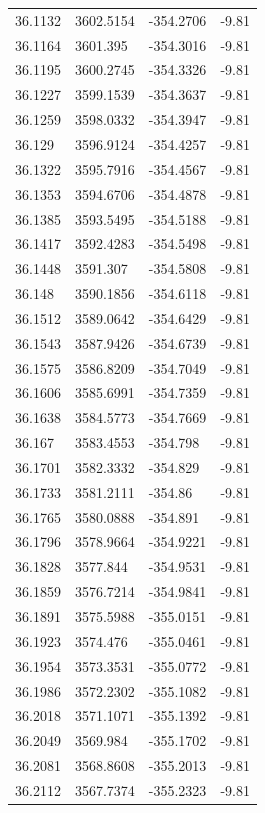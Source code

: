 \begin{table}[H]
\begin{tabular}{llll}
36.1132 & 3602.5154 & -354.2706 & -9.81 \\
36.1164 & 3601.395 & -354.3016 & -9.81 \\
36.1195 & 3600.2745 & -354.3326 & -9.81 \\
36.1227 & 3599.1539 & -354.3637 & -9.81 \\
36.1259 & 3598.0332 & -354.3947 & -9.81 \\
36.129 & 3596.9124 & -354.4257 & -9.81 \\
36.1322 & 3595.7916 & -354.4567 & -9.81 \\
36.1353 & 3594.6706 & -354.4878 & -9.81 \\
36.1385 & 3593.5495 & -354.5188 & -9.81 \\
36.1417 & 3592.4283 & -354.5498 & -9.81 \\
36.1448 & 3591.307 & -354.5808 & -9.81 \\
36.148 & 3590.1856 & -354.6118 & -9.81 \\
36.1512 & 3589.0642 & -354.6429 & -9.81 \\
36.1543 & 3587.9426 & -354.6739 & -9.81 \\
36.1575 & 3586.8209 & -354.7049 & -9.81 \\
36.1606 & 3585.6991 & -354.7359 & -9.81 \\
36.1638 & 3584.5773 & -354.7669 & -9.81 \\
36.167 & 3583.4553 & -354.798 & -9.81 \\
36.1701 & 3582.3332 & -354.829 & -9.81 \\
36.1733 & 3581.2111 & -354.86 & -9.81 \\
36.1765 & 3580.0888 & -354.891 & -9.81 \\
36.1796 & 3578.9664 & -354.9221 & -9.81 \\
36.1828 & 3577.844 & -354.9531 & -9.81 \\
36.1859 & 3576.7214 & -354.9841 & -9.81 \\
36.1891 & 3575.5988 & -355.0151 & -9.81 \\
36.1923 & 3574.476 & -355.0461 & -9.81 \\
36.1954 & 3573.3531 & -355.0772 & -9.81 \\
36.1986 & 3572.2302 & -355.1082 & -9.81 \\
36.2018 & 3571.1071 & -355.1392 & -9.81 \\
36.2049 & 3569.984 & -355.1702 & -9.81 \\
36.2081 & 3568.8608 & -355.2013 & -9.81 \\
36.2112 & 3567.7374 & -355.2323 & -9.81 \\

\end{tabular}
\end{table}
